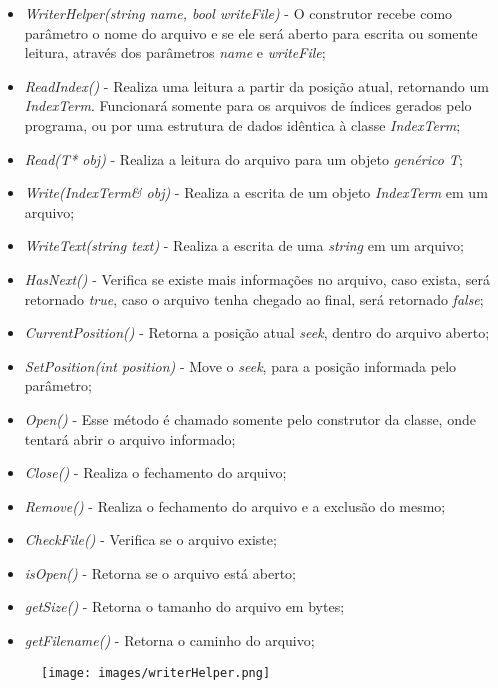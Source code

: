 \documentclass[12pt]{article}
\begin{document}
\begin{itemize}
\item \textit{WriterHelper(string name, bool writeFile)} - O construtor recebe como parâmetro o nome do arquivo e se ele será aberto para escrita ou somente leitura, através dos parâmetros \textit{name} e \textit{writeFile};
\item \textit{ReadIndex()} - Realiza uma leitura a partir da posição atual, retornando um \textit{IndexTerm}. Funcionará somente para os arquivos de índices gerados pelo programa, ou por uma estrutura de dados idêntica à classe \textit{IndexTerm};
\item \textit{Read(T* obj)} - Realiza a leitura do arquivo para um objeto \textit{genérico T};
\item \textit{Write(IndexTerm\& obj)} - Realiza a escrita de um objeto \textit{IndexTerm} em um arquivo;
\item \textit{WriteText(string text)} - Realiza a escrita de uma \textit{string} em um arquivo;
\item \textit{HasNext()} - Verifica se existe mais informações no arquivo, caso exista, será retornado \textit{true}, caso o arquivo tenha chegado ao final, será retornado \textit{false};
\item \textit{CurrentPosition()} - Retorna a posição atual \textit{seek}, dentro do arquivo aberto;
\item \textit{SetPosition(int position)} - Move o \textit{seek}, para a posição informada pelo parâmetro;
\item \textit{Open()} - Esse método é chamado somente pelo construtor da classe, onde tentará abrir o arquivo informado;
\item \textit{Close()} - Realiza o fechamento do arquivo;
\item \textit{Remove()} - Realiza o fechamento do arquivo e a exclusão do mesmo;
\item \textit{CheckFile()} - Verifica se o arquivo existe;
\item \textit{isOpen()} - Retorna se o arquivo está aberto;
\item \textit{getSize()} - Retorna o tamanho do arquivo em bytes;
\item \textit{getFilename()} - Retorna o caminho do arquivo;
\end{itemize}

\begin{figure}[ht]
\centering
\texttt{[image: images/writerHelper.png]}
\label{fig:writerHelper}
\end{figure}
\end{document}
